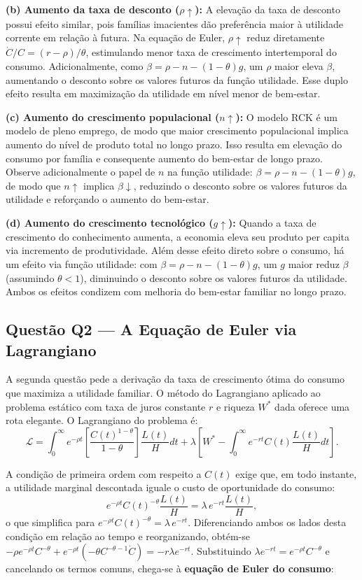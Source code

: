\documentclass[12pt, a4paper]{article}
\begin{document}
\textbf{(b) Aumento da taxa de desconto ($\rho\uparrow$):} A elevação da taxa de desconto possui efeito similar, pois famílias imacientes dão preferência maior à utilidade corrente em relação à futura. Na equação de Euler, $\rho\uparrow$ reduz diretamente $\dot{C}/C = (r-\rho)/\theta$, estimulando menor taxa de crescimento intertemporal do consumo. Adicionalmente, como $\beta = \rho - n - (1-\theta)g$, um $\rho$ maior eleva $\beta$, aumentando o desconto sobre os valores futuros da função utilidade. Esse duplo efeito resulta em maximização da utilidade em nível menor de bem-estar.

\textbf{(c) Aumento do crescimento populacional ($n\uparrow$):} O modelo RCK é um modelo de pleno emprego, de modo que maior crescimento populacional implica aumento do nível de produto total no longo prazo. Isso resulta em elevação do consumo por família e consequente aumento do bem-estar de longo prazo. Observe adicionalmente o papel de $n$ na função utilidade: $\beta = \rho - n - (1-\theta)g$, de modo que $n\uparrow$ implica $\beta\downarrow$, reduzindo o desconto sobre os valores futuros da utilidade e reforçando o aumento do bem-estar.

\textbf{(d) Aumento do crescimento tecnológico ($g\uparrow$):} Quando a taxa de crescimento do conhecimento aumenta, a economia eleva seu produto per capita via incremento de produtividade. Além desse efeito direto sobre o consumo, há um efeito via função utilidade: com $\beta = \rho - n - (1-\theta)g$, um $g$ maior reduz $\beta$ (assumindo $\theta < 1$), diminuindo o desconto sobre os valores futuros da utilidade. Ambos os efeitos condizem com melhoria do bem-estar familiar no longo prazo.

\subsection{Questão Q2 --- A Equação de Euler via Lagrangiano}

A segunda questão pede a derivação da taxa de crescimento ótima do consumo que maximiza a utilidade familiar. O método do Lagrangiano aplicado ao problema estático com taxa de juros constante $r$ e riqueza $W^*$ dada oferece uma rota elegante. O Lagrangiano do problema é:
\[
\mathcal{L} = \int_0^\infty e^{-\rho t}\!\left[\frac{C(t)^{1-\theta}}{1-\theta}\right]\frac{L(t)}{H}dt + \lambda\!\left[W^* - \int_0^\infty e^{-rt}C(t)\frac{L(t)}{H}dt\right].
\]

A condição de primeira ordem com respeito a $C(t)$ exige que, em todo instante, a utilidade marginal descontada iguale o custo de oportunidade do consumo:
\[
e^{-\rho t}C(t)^{-\theta}\frac{L(t)}{H} = \lambda\, e^{-rt}\frac{L(t)}{H},
\]
o que simplifica para $e^{-\rho t}C(t)^{-\theta} = \lambda\, e^{-rt}$. Diferenciando ambos os lados desta condição em relação ao tempo e reorganizando, obtém-se $-\rho e^{-\rho t}C^{-\theta} + e^{-\rho t}(-\theta C^{-\theta-1}\dot{C}) = -r\lambda e^{-rt}$. Substituindo $\lambda e^{-rt} = e^{-\rho t}C^{-\theta}$ e cancelando os termos comuns, chega-se à \textbf{equação de Euler do consumo}:
\end{document}
